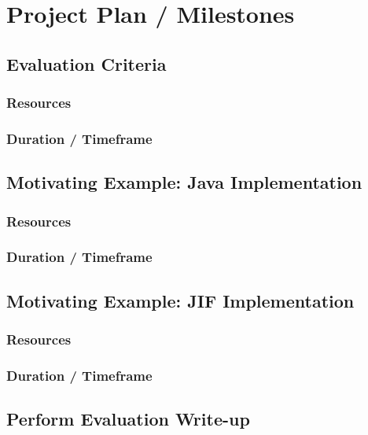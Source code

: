 \section{Project Plan / Milestones}

\subsection{Evaluation Criteria}

	\subsubsection{Resources}
	
	\subsubsection{Duration / Timeframe}

\subsection{Motivating Example: Java Implementation}

	\subsubsection{Resources}
	
	\subsubsection{Duration / Timeframe}

\subsection{Motivating Example: JIF Implementation}

	\subsubsection{Resources}
	
	\subsubsection{Duration / Timeframe}
	
\subsection{Perform Evaluation Write-up}

